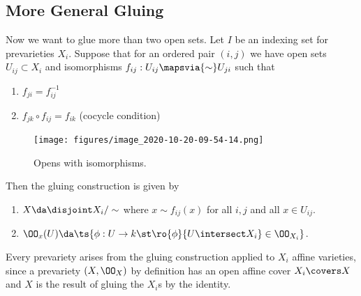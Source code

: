 \hypertarget{more-general-gluing}{%
\subsection{More General Gluing}\label{more-general-gluing}}

Now we want to glue more than two open sets. Let \(I\) be an indexing
set for prevarieties \(X_i\). Suppose that for an ordered pair
\((i, j)\) we have open sets \(U_{ij} \subset X_i\) and isomorphisms
\(f_{ij}: U_{ij} \mapsvia{\sim} U_{ji}\) such that

\begin{enumerate}
\def\labelenumi{\alph{enumi}.}
\item
  \(f_{ji} = f_{ij}^{-1}\)
\item
  \(f_{jk} \circ f_{ij} = f_{ik}\) (cocycle condition)
\end{enumerate}

\begin{figure}
\centering
\texttt{[image: figures/image\_2020-10-20-09-54-14.png]}
\caption{Opens with isomorphisms.}
\end{figure}

Then the gluing construction is given by

\begin{enumerate}
\def\labelenumi{\arabic{enumi}.}
\item
  \(X\da \disjoint X_i/\sim\) where \(x\sim f_{ij}(x)\) for all \(i,j\)
  and all \(x\in U_{ij}\).
\item
  \(\OO_x(U) \da \ts{\phi:U\to k \st \ro{\phi}{U\intersect X_i} \in \OO_{X_i} }\).
\end{enumerate}

Every prevariety arises from the gluing construction applied to \(X_i\)
affine varieties, since a prevariety \((X, \OO_X)\) by definition has an
open affine cover \(X_i \covers X\) and \(X\) is the result of gluing
the \(X_i\)s by the identity.

